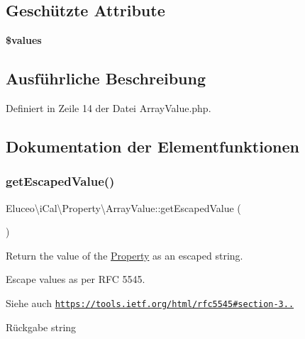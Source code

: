 \subsection*{Geschützte Attribute}
\begin{DoxyCompactItemize}
\item 
\mbox{\label{class_eluceo_1_1i_cal_1_1_property_1_1_array_value_a14fd0a3cd0e0d8344aaf14a759d2b77b}} 
{\bfseries \$values}
\end{DoxyCompactItemize}


\subsection{Ausführliche Beschreibung}


Definiert in Zeile 14 der Datei Array\+Value.\+php.



\subsection{Dokumentation der Elementfunktionen}
\mbox{\label{class_eluceo_1_1i_cal_1_1_property_1_1_array_value_ac3af9696c29dc74c2e1ab7ca220c4228}} 
\subsubsection{\texorpdfstring{get\+Escaped\+Value()}{getEscapedValue()}\hspace{0.1cm}{\footnotesize\ttfamily [1/3]}}
{\footnotesize\ttfamily Eluceo\textbackslash{}i\+Cal\textbackslash{}\+Property\textbackslash{}\+Array\+Value\+::get\+Escaped\+Value (\begin{DoxyParamCaption}{ }\end{DoxyParamCaption})}

Return the value of the \mbox{\hyperlink{class_eluceo_1_1i_cal_1_1_property}{Property}} as an escaped string.

Escape values as per R\+FC 5545.

\begin{DoxySeeAlso}{Siehe auch}
\href{https://tools.ietf.org/html/rfc5545#section-3.3.11}{\tt https\+://tools.\+ietf.\+org/html/rfc5545\#section-\/3..}
\end{DoxySeeAlso}
\begin{DoxyReturn}{Rückgabe}
string 
\end{DoxyReturn}


